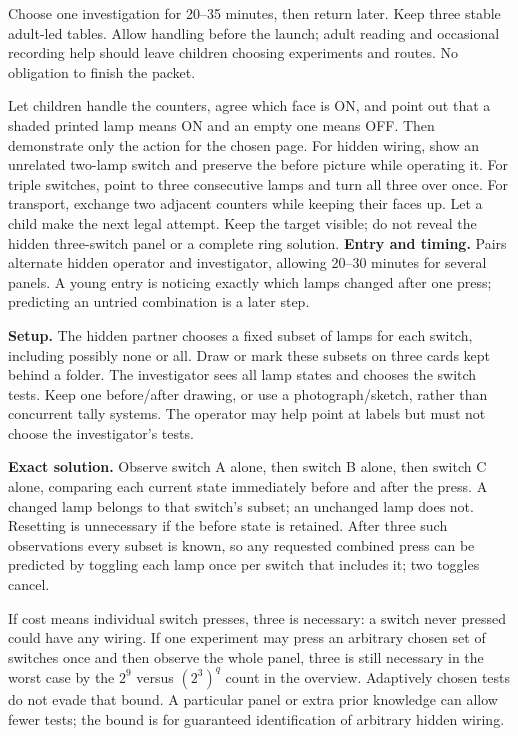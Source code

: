 Choose one investigation for 20--35 minutes, then return later. Keep three stable adult-led tables. Allow handling before the launch; adult reading and occasional recording help should leave children choosing experiments and routes. No obligation to finish the packet.

Let children handle the counters, agree which face is ON, and point out that a shaded printed lamp means ON and an empty one means OFF. Then demonstrate only the action for the chosen page. For hidden wiring, show an unrelated two-lamp switch and preserve the before picture while operating it. For triple switches, point to three consecutive lamps and turn all three over once. For transport, exchange two adjacent counters while keeping their faces up. Let a child make the next legal attempt. Keep the target visible; do not reveal the hidden three-switch panel or a complete ring solution.
\newpage
{}
\textbf{Entry and timing.} Pairs alternate hidden operator and investigator, allowing 20--30 minutes for several panels. A young entry is noticing exactly which lamps changed after one press; predicting an untried combination is a later step.

\textbf{Setup.} The hidden partner chooses a fixed subset of lamps for each switch, including possibly none or all. Draw or mark these subsets on three cards kept behind a folder. The investigator sees all lamp states and chooses the switch tests. Keep one before/after drawing, or use a photograph/sketch, rather than concurrent tally systems. The operator may help point at labels but must not choose the investigator's tests.

\textbf{Exact solution.} Observe switch A alone, then switch B alone, then switch C alone, comparing each current state immediately before and after the press. A changed lamp belongs to that switch's subset; an unchanged lamp does not. Resetting is unnecessary if the before state is retained. After three such observations every subset is known, so any requested combined press can be predicted by toggling each lamp once per switch that includes it; two toggles cancel.

If cost means individual switch presses, three is necessary: a switch never pressed could have any wiring. If one experiment may press an arbitrary chosen set of switches once and then observe the whole panel, three is still necessary in the worst case by the $2^9$ versus $(2^3)^q$ count in the overview. Adaptively chosen tests do not evade that bound. A particular panel or extra prior knowledge can allow fewer tests; the bound is for guaranteed identification of arbitrary hidden wiring.

